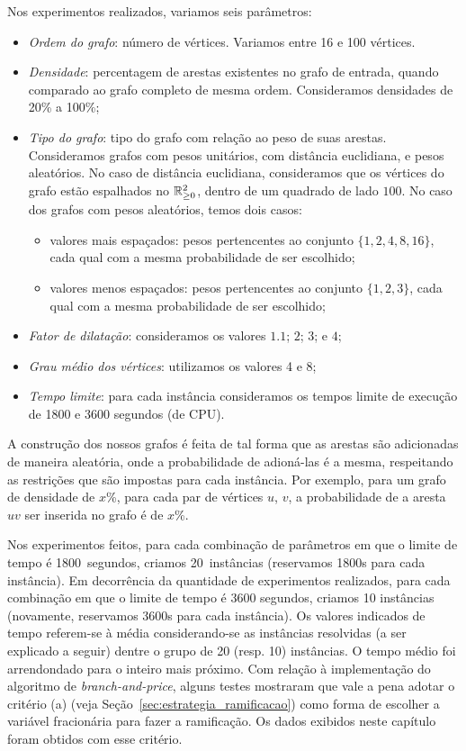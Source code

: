 Nos experimentos realizados, variamos seis parâmetros:

\begin{itemize}
\item \emph{Ordem do grafo}: número de vértices.
  Variamos entre 16 e 100 vértices.
\item \emph{Densidade}: percentagem de arestas existentes no grafo de
  entrada, quando comparado ao grafo completo de mesma ordem.
  Consideramos densidades de 20\% a 100\%;
\item \emph{Tipo do grafo}: tipo do grafo com relação ao peso de suas
  arestas.  Consideramos grafos com pesos unitários, com distância
  euclidiana, e pesos aleatórios.  No caso de distância euclidiana,
  consideramos que os vértices do grafo estão espalhados no
  $\mathbb{R}^2_{\ge 0}$, dentro de um quadrado de lado $100$. No caso dos
  grafos com pesos aleatórios, temos dois casos:
  \begin{itemize}
  \item valores mais espaçados: pesos pertencentes ao conjunto
    $\{1, 2, 4, 8, 16\}$, cada qual com a mesma probabilidade de ser escolhido;
  \item valores menos espaçados: pesos pertencentes ao conjunto 
    $\{1, 2, 3\}$, cada qual com a mesma probabilidade de ser escolhido;   
  \end{itemize}
\item \emph{Fator de dilatação}: consideramos os valores $\num{1,1}$; $2$; $3$; e $4$;
\item \emph{Grau médio dos vértices}: utilizamos os valores 4 e 8;
\item \emph{Tempo limite}: para cada instância consideramos os tempos
  limite de execução de 1800 e 3600 segundos (de CPU). 
\end{itemize}

A construção dos nossos grafos é feita de tal forma que as arestas são
adicionadas de maneira aleatória, onde a probabilidade de adioná-las é
a mesma, respeitando as restrições que são impostas para cada
instância. Por exemplo, para um grafo de densidade de $x$\%, para cada
par de vértices $u$, $v$, a probabilidade de a aresta $uv$ ser
inserida no grafo é de $x$\%.

Nos experimentos feitos, para cada combinação de parâmetros em que o
limite de tempo é 1800~segundos, criamos 20~instâncias (reservamos 1800s
para cada instância). Em decorrência
da quantidade de experimentos realizados, para cada combinação em que
o limite de tempo é 3600 segundos, criamos 10 instâncias
(novamente, reservamos 3600s para cada instância). Os valores
indicados de tempo referem-se à
média considerando-se as instâncias resolvidas (a ser explicado a seguir)
dentre o grupo de 20 (resp. 10) instâncias.  O tempo médio foi arrendondado
para o inteiro mais próximo. Com relação à
implementação do algoritmo de \emph{branch-and-price}, alguns testes
mostraram que vale a pena adotar o critério (a) (veja
Seção~\ref{sec:estrategia_ramificacao}) como forma de escolher a
variável fracionária para fazer a ramificação. Os dados exibidos neste
capítulo foram obtidos com esse critério.

